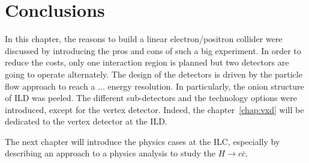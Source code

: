    \section{Conclusions}

   In this chapter, the reasons to build a linear electron/positron collider were discussed by introducing the pros and cons of such a big experiment.
   In order to reduce the costs, only one interaction region is planned but two detectors are going to operate alternately. 
   The design of the detectors is driven by the particle flow approach to reach a ... energy resolution.
   In particularly, the  onion structure of \gls{ILD} was peeled. 
   The different sub-detectors and the technology options were introduced, except for the vertex detector.
   Indeed, the chapter~\ref{chap:vxd} will be dedicated to the vertex detector at the \gls{ILD}.

   The next chapter will introduce the physics cases at the \gls{ILC}, especially by describing an approach to a physics analysis to study the $H \rightarrow c\bar{c}$.


